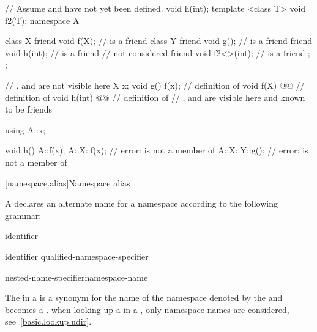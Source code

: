 \begin{codeblock}
// Assume  and  have not yet been defined.
void h(int);
template <class T> void f2(T);
namespace A {
	class X {
		friend void f(X);       //  is a friend
		class Y {
			friend void g();        //  is a friend
			friend void h(int);     //  is a friend
						//  not considered
			friend void f2<>(int);  //  is a friend
		};
	};

	// ,  and  are not visible here
	X x;
	void g() { f(x); }		// definition of 
	void f(X) @@	   // definition of 
	void h(int) @@      // definition of 
	// ,  and  are visible here and known to be friends
}

using A::x;

void h()
{
	A::f(x);
	A::X::f(x);             // error:  is not a member of 
	A::X::Y::g();           // error:  is not a member of 
}
\end{codeblock}
\exitexampleb

[namespace.alias]{Namespace alias}%
%
%

\pnum
A  declares an alternate name for a
namespace according to the following grammar:

\begin{bnf}
\br
        identifier
\end{bnf}

\begin{bnf}
\br
         identifier \terminal{=} qualified-namespace-specifier \terminal{;}
\end{bnf}

\begin{bnf}
\br
	\terminal{::}\opt nested-name-specifier\opt namespace-name
\end{bnf}

\pnum
The  in a  is
a synonym for the name of the namespace denoted by the
 and becomes a
.
\enternote
when looking up a  in a
, only namespace names are
considered, see~\ref{basic.lookup.udir}.
\exitnote


